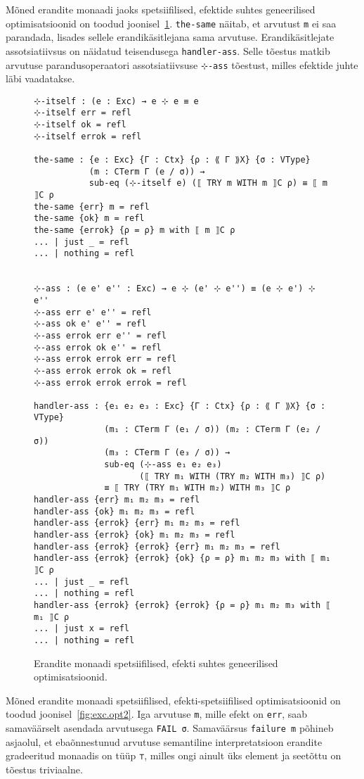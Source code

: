 \documentclass[a4paper,12pt]{article}
\begin{document}
Mõned erandite monaadi jaoks spetsiifilised, efektide suhtes geneerilised optimisatsioonid on toodud joonisel~\ref{fig:exc.opt1}.
{\tt the-same} näitab, et arvutust {\tt m} ei saa parandada, lisades sellele erandikäsitlejana sama arvutuse.
Erandikäsitlejate assotsiatiivsus on näidatud teisendusega {\tt handler-ass}.
Selle tõestus matkib arvutuse parandusoperaatori assotsiatiivsuse {\tt ⊹-ass} tõestust, milles efektide juhte läbi vaadatakse.

\begin{figure}
  \begin{BVerbatim}
⊹-itself : (e : Exc) → e ⊹ e ≡ e
⊹-itself err = refl
⊹-itself ok = refl
⊹-itself errok = refl

the-same : {e : Exc} {Γ : Ctx} {ρ : ⟪ Γ ⟫X} {σ : VType}
           (m : CTerm Γ (e / σ)) →
           sub-eq (⊹-itself e) (⟦ TRY m WITH m ⟧C ρ) ≡ ⟦ m ⟧C ρ
the-same {err} m = refl
the-same {ok} m = refl
the-same {errok} {ρ = ρ} m with ⟦ m ⟧C ρ
... | just _ = refl
... | nothing = refl


⊹-ass : (e e' e'' : Exc) → e ⊹ (e' ⊹ e'') ≡ (e ⊹ e') ⊹ e''
⊹-ass err e' e'' = refl
⊹-ass ok e' e'' = refl
⊹-ass errok err e'' = refl
⊹-ass errok ok e'' = refl
⊹-ass errok errok err = refl
⊹-ass errok errok ok = refl
⊹-ass errok errok errok = refl

handler-ass : {e₁ e₂ e₃ : Exc} {Γ : Ctx} {ρ : ⟪ Γ ⟫X} {σ : VType}
              (m₁ : CTerm Γ (e₁ / σ)) (m₂ : CTerm Γ (e₂ / σ))
              (m₃ : CTerm Γ (e₃ / σ)) →
              sub-eq (⊹-ass e₁ e₂ e₃)
                     (⟦ TRY m₁ WITH (TRY m₂ WITH m₃) ⟧C ρ)
              ≡ ⟦ TRY (TRY m₁ WITH m₂) WITH m₃ ⟧C ρ
handler-ass {err} m₁ m₂ m₃ = refl
handler-ass {ok} m₁ m₂ m₃ = refl
handler-ass {errok} {err} m₁ m₂ m₃ = refl
handler-ass {errok} {ok} m₁ m₂ m₃ = refl
handler-ass {errok} {errok} {err} m₁ m₂ m₃ = refl
handler-ass {errok} {errok} {ok} {ρ = ρ} m₁ m₂ m₃ with ⟦ m₁ ⟧C ρ
... | just _ = refl
... | nothing = refl
handler-ass {errok} {errok} {errok} {ρ = ρ} m₁ m₂ m₃ with ⟦ m₁ ⟧C ρ
... | just x = refl
... | nothing = refl
  \end{BVerbatim}
  \caption{Erandite monaadi spetsiifilised, efekti suhtes geneerilised optimisatsioonid.}
  \label{fig:exc.opt1}
\end{figure}

Mõned erandite monaadi spetsiifilised, efekti-spetsiifilised optimisatsioonid on toodud joonisel~\ref{fig:exc.opt2}.
Iga arvutuse {\tt m}, mille efekt on {\tt err}, saab samaväärselt asendada arvutusega {\tt FAIL σ}.
Samaväärsus {\tt failure m} põhineb asjaolul, et ebaõnnestunud arvutuse semantiline interpretatsioon erandite gradeeritud monaadis on tüüp {\tt ⊤}, milles ongi ainult üks element ja seetõttu on tõestus triviaalne.
\end{document}
